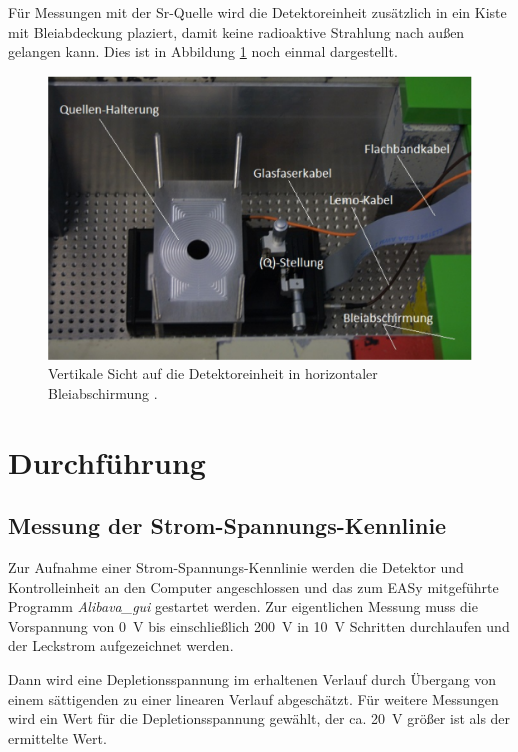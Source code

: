 Für Messungen mit der Sr-Quelle wird die Detektoreinheit zusätzlich in ein Kiste
mit Bleiabdeckung plaziert, damit keine radioaktive Strahlung nach außen gelangen
kann. Dies ist in Abbildung \ref{fig:quell} noch einmal dargestellt.
\begin{figure}[htb]
  \centering
  \includegraphics{images/Abschirmung.png}
  \caption{Vertikale Sicht auf die Detektoreinheit in horizontaler Bleiabschirmung \cite{anleitung}.}
  \label{fig:quell}
\end{figure}

\FloatBarrier
\section{Durchführung}
\label{sec:Durchführung}

\subsection{Messung der Strom-Spannungs-Kennlinie}
\label{sec:Kennlinie}
Zur Aufnahme einer Strom-Spannungs-Kennlinie werden die Detektor und Kontrolleinheit
an den Computer angeschlossen und das zum EASy mitgeführte Programm \textit{Alibava\_gui}
gestartet werden. Zur eigentlichen Messung muss die Vorspannung von \SI{0}{\volt} bis
einschließlich \SI{200}{\volt} in \SI{10}{\volt} Schritten durchlaufen und 
der Leckstrom aufgezeichnet werden.

Dann wird eine Depletionsspannung im erhaltenen Verlauf durch Übergang von einem
sättigenden zu einer linearen Verlauf abgeschätzt. Für weitere Messungen wird
ein Wert für die Depletionsspannung gewählt, der ca. \SI{20}{\volt} größer ist als
der ermittelte Wert.

